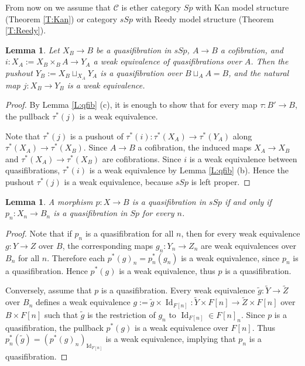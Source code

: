 \documentclass[12pt]{amsart}
\theoremstyle{plain}
\newtheorem{Lem}[Thm]{Lemma}
\theoremstyle{definition}
\numberwithin{equation}{section}
\newcommand{\cal}[1]{\mathcal{#1}}
\newcommand{\C}[1]{\cal#1}
\newcommand{\wt}{\widetilde}
\newcommand{\rl}[1]{Lemma \ref{L:#1}}
\newcommand{\rt}[1] {Theorem \ref{T:#1}}
\newcommand{\Id}{\operatorname{Id}}
\begin{document}
From now on we assume that ${\C{C}}$ is
ether category $Sp$ with Kan model structure (\rt{Kan}) or category $sSp$
with Reedy model structure (\rt{Reedy}). 

\begin{Lem} \label{L:pushout}
Let $X_B\to B$ be a quasifibration in $sSp$, $A\to B$ a
cofibration, and $i:X_A:=X_B\times_B A\to Y_A$ a weak equivalence
of quasifibrations over $A$. Then the pushout
$Y_B:=X_B\sqcup_{X_A}Y_A$ is a quasifibration over $B\sqcup_A
A=B$, and the natural map $j:X_B\to Y_B$ is a weak equivalence.
\end{Lem}

\begin{proof}
By \rl{qfib} (c), it is enough to show that for every map
$\tau:B'\to B$, the pullback $\tau^*(j)$ is a weak equivalence.

Note that $\tau^*(j)$ is a pushout of $\tau^*(i):\tau^*(X_A)\to
\tau^*(Y_A)$ along $\tau^*(X_A)\to \tau^*(X_B)$. Since $A\to B$ a
cofibration, the induced maps $X_A\to X_B$ and $\tau^*(X_A)\to
\tau^*(X_B)$ are cofibrations. Since $i$ is a weak equivalence
between quasifibrations, $\tau^*(i)$ is a weak equivalence by
\rl{qfib} (b). Hence the pushout $\tau^*(j)$ is a weak
equivalence, because $sSp$ is left proper.
\end{proof}

\begin{Lem} \label{L:qfib0}
A morphism $p:X\to B$ is a quasifibration in $sSp$ if and only if
$p_n:X_n\to B_n$ is a quasifibration in $Sp$ for every $n$.
\end{Lem}

\begin{proof}
Note that if $p_n$ is a quasifibration for all $n$, then for every
weak equivalence $g:Y\to Z$ over $B$, the corresponding maps
$g_n:Y_n\to Z_n$ are weak equivalences over $B_n$ for all $n$.
Therefore each $p^*(g)_n=p_n^*(g_n)$ is a weak equivalence, since
$p_n$ is a quasifibration. Hence $p^*(g)$ is a weak equivalence,
thus $p$ is a quasifibration.

Conversely, assume that $p$ is a quasifibration. Every weak
equivalence $\wt{g}:\wt{Y}\to \wt{Z}$ over $B_n$ defines a weak
equivalence $g:=\wt{g}\times\Id_{F[n]}:\wt{Y}\times F[n]\to
\wt{Z}\times F[n]$ over $B\times F[n]$ such that $\wt{g}$ is the
restriction of $g_n$ to $\Id_{F[n]}\in F[n]_n$. Since $p$ is a
quasifibration, the pullback $p^*(g)$ is a weak equivalence over
$F[n]$. Thus $p_n^*(\wt{g})=(p^*(g)_n)_{\Id_{F[n]}}$ is a weak
equivalence, implying that $p_n$ is a quasifibration.
\end{proof}
\end{document}
